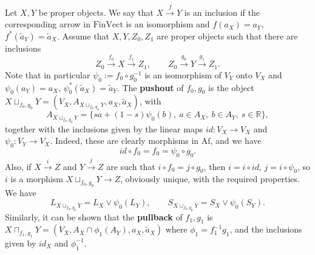 \documentclass[12pt]{article}
\theoremstyle{definition}
\theoremstyle{remark}
\def \Af{\mathrm{Af}}
\def \FV{\mathrm{FinVect}}
\begin{document}
Let $X,Y$ be proper objects. We say that $X\xrightarrow{f} Y$ is an inclusion if the
corresponding arrow in $\FV$ is an isomorphism and $f(a_X)=a_Y$, $f^*(\tilde a_Y)=\tilde
a_X$.  Assume that $X,Y,Z_0,Z_1$ are proper
objects such that there are inclusions
\[
Z_0\xrightarrow{f_0} X\xrightarrow{f_1} Z_1,\qquad Z_0\xrightarrow{g_0} Y\xrightarrow{g_1}
Z_1.
\]
Note that in particular $\psi_0:=f_0\circ g_0^{-1}$ is an isomorphism of $V_Y$ onto $V_X$ and
$\psi_0(a_Y)=a_X$, $\psi_0^*(\tilde a_X)=\tilde a_Y$. 
The \textbf{pushout} of $f_0,g_0$ is the object $X\sqcup_{f_0,g_0} Y=(V_X,
A_{X\sqcup_{f_0,g_0} Y}, a_X,
\tilde a_X)$, with 
\[
A_{X\sqcup_{f_0,g_0} Y}=\{sa+(1-s)\psi_0(b),\ a\in A_X,\ b\in A_Y,\ s\in \mathbb R\},
\]
together with the inclusions given by the linear maps $id:V_X\to V_X$ and $\psi_0:V_Y\to
V_X$. Indeed, these are clearly morphisms in $\Af$, and we have 
\[
id\circ f_0=f_0=\psi_0\circ g_0.
\]
Also, if $X\xrightarrow{i} Z$ and $Y\xrightarrow{j} Z$ are such that $i\circ f_0=j\circ
g_0$, then $i=i\circ id$, $j=i\circ \psi_0$, so $i$ is a morphism $X\sqcup_{f_0,g_0} Y\to Z$,
obviously unique, with the required properties. We have
\[
L_{X\sqcup_{f_0,g_0}Y}=L_X\vee \psi_0(L_Y),\qquad S_{X\sqcup_{f_0,g_0}Y}=S_X\vee
\psi_0(S_Y).
\]
Similarly, it can be shown that the \textbf{pullback} of $f_1, g_1$ is
$X\sqcap_{f_1,g_1}Y=(V_X, A_X\cap \phi_1(A_Y),a_X,\tilde a_X)$ where $\phi_1=f_1^{-1}g_1$,
and the inclusions given by $id_X$ and $\phi_1^{-1}$.
\end{document}
